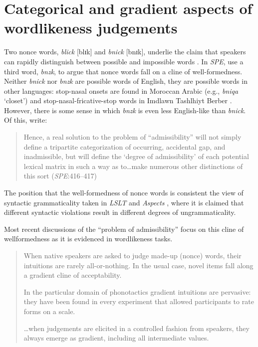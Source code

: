 \chapter{Categorical and gradient aspects of wordlikeness judgements} 
\label{gradience}

Two nonce words, \emph{blick} [blɪk] and \emph{bnick} [bnɪk], underlie the claim that speakers can rapidly distinguish between possible and impossible words \citet{Halle1962}. In \emph{SPE}, \citet{SPE} use a third word, \emph{bnzk}, to argue that nonce words fall on a cline of well-formedness. Neither \emph{bnick} nor \emph{bnzk} are possible words of English, they are possible words in other languages: stop-nasal onsets are found in Moroccan Arabic (e.g., \emph{bniqa} `closet') and stop-nasal-fricative-stop words in Imdlawn Tashlhiyt Berber \citep{Dell1985}. However, there is some sense in which \emph{bnzk} is even less English-like than \emph{bnick}. Of this, \citeauthor{SPE} write:

\begin{quote}
Hence, a real solution to the problem of ``admissibility'' will not simply define a tripartite categorization of occurring, accidental gap, and inadmissible, but will define the `degree of admissibility' of each potential lexical matrix in such a way as to\ldots{}make numerous other distinctions of this sort (\emph{SPE}:416--417)
\end{quote}

\noindent
The position that the well-formedness of nonce words is consistent the view of syntactic grammaticality taken in \emph{LSLT} and \emph{Aspects} \citep{LSLT,ASPECTS}, where it is claimed that different syntactic violations result in different degrees of ungrammaticality.

Most recent discussions of the ``problem of admissibility'' focus on this cline of wellformedness as it is evidenced in wordlikeness tasks.

\begin{quote}
When native speakers are asked to judge made-up (nonce) words, their intuitions are rarely all-or-nothing. In the usual case, novel items fall along a gradient cline of acceptability. \citep[][9]{Albright2009a}

In the particular domain of phonotactics gradient intuitions are pervasive: they have been found in every experiment that allowed participants to rate forms on a scale.
\citep[][382]{Hayes2008a}

\ldots{}when judgements are elicited in a controlled fashion from speakers, they always emerge as gradient, including all intermediate values. \citep[371]{Shademan2006} 
\end{quote}

